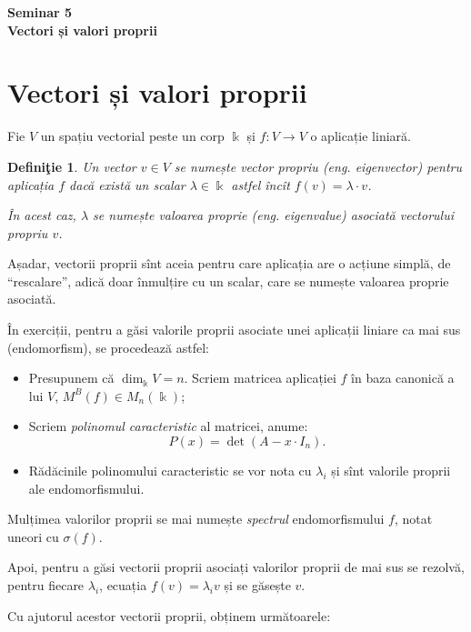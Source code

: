 \documentclass[11pt,a4paper]{article}
\theoremstyle{dotless}
\theoremstyle{dotlessdr}
\newtheorem{definition}{Defini\c{t}ie}[section]
\begin{document}
\begin{center}
  {\large\textbf{Seminar 5 \\ Vectori și valori proprii}}
\end{center}

\vspace{1cm}

\section{Vectori și valori proprii}
\label{sec:vvp}

Fie $V$ un spațiu vectorial peste un corp $\Bbbk$ și $f : V \to V$ o aplicație
liniară.

\begin{definition}\label{def:vvp}
  Un vector $v \in V$ se numește \emph{vector propriu} (eng. \emph{eigenvector})
  pentru aplicația $f$ dacă există un scalar $\lambda \in \Bbbk$ astfel încît
  $f(v) = \lambda \cdot v$.

  În acest caz, $\lambda$ se numește \emph{valoarea proprie} (eng. \emph{eigenvalue})
  asociată vectorului  propriu $v$.
\end{definition}

Așadar, vectorii proprii sînt aceia pentru care aplicația are o acțiune simplă,
de \enquote{rescalare}, adică doar înmulțire cu un scalar, care se numește
valoarea proprie asociată.

În exerciții, pentru a găsi valorile proprii asociate unei aplicații liniare
ca mai sus (endomorfism), se procedează astfel:
\begin{itemize}
\item Presupunem că $\dim_\Bbbk V = n$. Scriem matricea aplicației $f$ în
  baza canonică a lui $V$, $M^B(f) \in M_n(\Bbbk)$;
\item Scriem \emph{polinomul caracteristic} al matricei, anume:
  \[
    P(x) = \det(A - x \cdot I_n).
  \]
\item Rădăcinile polinomului caracteristic se vor nota cu $\lambda_i$ și
  sînt valorile proprii ale endomorfismului.
\end{itemize}

Mulțimea valorilor proprii se mai numește \emph{spectrul} endomorfismului
$f$, notat uneori cu $\sigma(f)$.

Apoi, pentru a găsi vectorii proprii asociați valorilor proprii de mai sus
se rezolvă, pentru fiecare $\lambda_i$, ecuația $f(v) = \lambda_i v$ și
se găsește $v$.

Cu ajutorul acestor vectorii proprii, obținem următoarele:
\end{document}
